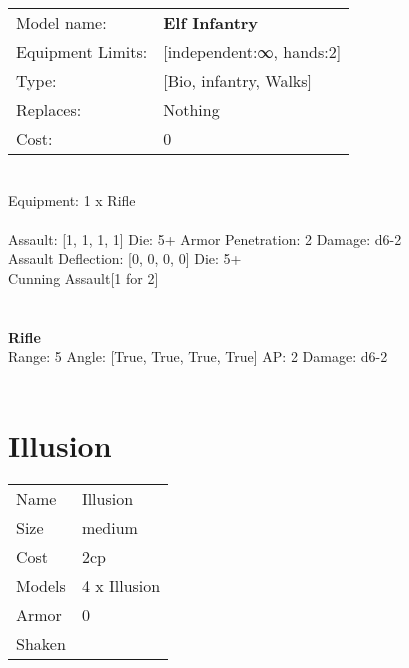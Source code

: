 \noindent
\begin{tabular}{ll}
Model name: &{\bf Elf Infantry } \\
Equipment Limits: &[independent:∞, hands:2] \\
Type: &[Bio, infantry, Walks] \\
Replaces: &Nothing \\
Cost: & 0\\
\end{tabular}
\ \\
Equipment: 1 x Rifle \\
\ \\
Assault: [1, 1, 1, 1] Die: 5+ Armor Penetration: 2 Damage: d6-2 \\
Assault Deflection: [0, 0, 0, 0] Die: 5+\\
\indent Cunning Assault[1 for 2]\\ 
 
\ \\

\ \\
{\bf Rifle } \\



Range: 5  Angle: [True, True, True, True] AP: 2 Damage: d6-2 \\




 
\ \\













\clearpage

\section{ Illusion }

\begin{tabular}{ll}
  Name & Illusion \\
  Size & medium\\
  Cost & 2cp\\
  Models & 4 x Illusion\\
  Armor & 0\\
  Shaken & \\
\end{tabular}

